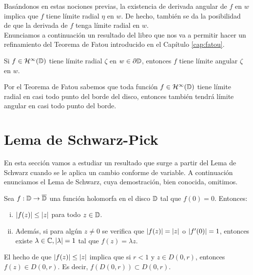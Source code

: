 Basándonos en estas nociones previas, la existencia de derivada angular de $f$ en $w$ implica que $f$ tiene límite radial $\eta$ en $w$. De hecho, también se da la posibilidad de que la derivada de $f$ tenga límite radial en $w$. \\

Enunciamos a continuación un resultado del libro \citet[capítulo 13]{conway2} que nos va a permitir hacer un refinamiento del Teorema de Fatou introducido en el Capítulo \ref{cap:fatou}. \\

\begin{corollary}
    Si $f \in \mathcal{H}^{\infty}(\mathbb{D})$ tiene límite radial $\zeta$ en $w \in \partial \mathbb{D}$, entonces $f$ tiene límite angular $\zeta$ en $w$.
\end{corollary}

Por el Teorema de Fatou sabemos que toda función $f \in \mathcal{H}^{\infty}(\mathbb{D})$ tiene límite radial en casi todo punto del borde del disco, entonces también tendrá límite angular en casi todo punto del borde. \\

\section{Lema de Schwarz-Pick}

En esta sección vamos a estudiar un resultado que surge a partir del Lema de Schwarz cuando se le aplica un cambio conforme de variable. A continuación enunciamos el Lema de Schwarz, cuya demostración, bien conocida, omitimos. \\

\begin{theorem}
    Sea $f: \mathbb{D} \to \overline{\mathbb{D}}$ una función holomorfa en el disco $\mathbb{D}$ tal que $f(0) = 0$. Entonces:
    \begin{enumerate}[(i)]
        \item $\left\lvert f(z)\right\rvert \leq \left\lvert z\right\rvert$ para todo $z \in \mathbb{D}$.
        \item Además, si para algún $z \not = 0$ se verifica que $\left\lvert f(z)\right\rvert = \left\lvert z\right\rvert$ o $\left\lvert f'(0)\right\rvert = 1$, entonces existe $\lambda \in \mathbb{C}, \left\lvert\lambda\right\rvert = 1$ tal que $f(z)=\lambda z$.
    \end{enumerate}
\end{theorem}

\begin{obs}
    El hecho de que $\left\lvert f(z)\right\rvert \leq \left\lvert z\right\rvert$ implica que si $r < 1$ y $z \in D(0,r)$, entonces $f(z) \in D(0,r)$. Es decir, $f(D(0,r)) \subset D(0,r)$. \\
\end{obs}

